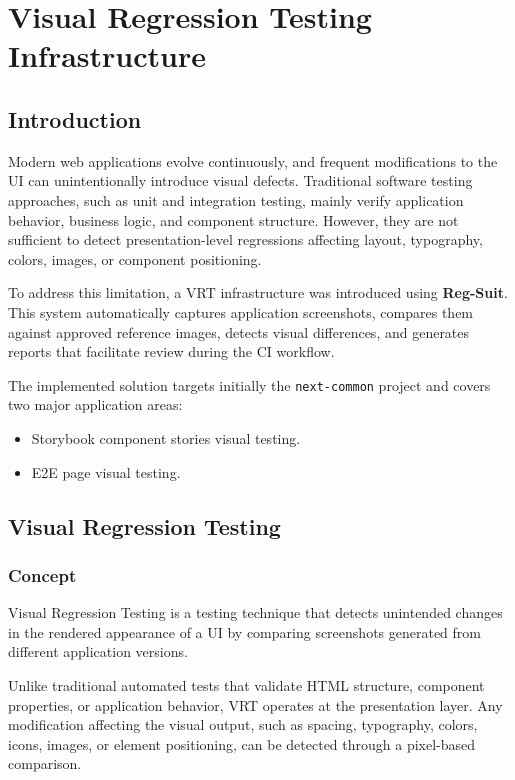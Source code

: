 \section{Visual Regression Testing Infrastructure}

\subsection{Introduction}

Modern web applications evolve continuously, and frequent modifications to the \acs{UI} can unintentionally introduce visual defects. Traditional software testing approaches, such as unit and integration testing, mainly verify application behavior, business logic, and component structure. However, they are not sufficient to detect presentation-level regressions affecting layout, typography, colors, images, or component positioning.

To address this limitation, a \acs{VRT} infrastructure was introduced using \textbf{Reg-Suit}. This system automatically captures application screenshots, compares them against approved reference images, detects visual differences, and generates reports that facilitate review during the \acs{CI} workflow.

The implemented solution targets initially the \texttt{next-common} project and covers two major application areas:

\begin{itemize}
    \item Storybook component stories visual testing.
    \item \acf{E2E} page visual testing.
\end{itemize}


\subsection{Visual Regression Testing}

\subsubsection{Concept}

Visual Regression Testing is a testing technique that detects unintended changes in the rendered appearance of a \ac{UI} by comparing screenshots generated from different application versions.

Unlike traditional automated tests that validate HTML structure, component properties, or application behavior, \ac{VRT} operates at the presentation layer. Any modification affecting the visual output, such as spacing, typography, colors, icons, images, or element positioning, can be detected through a pixel-based comparison.

